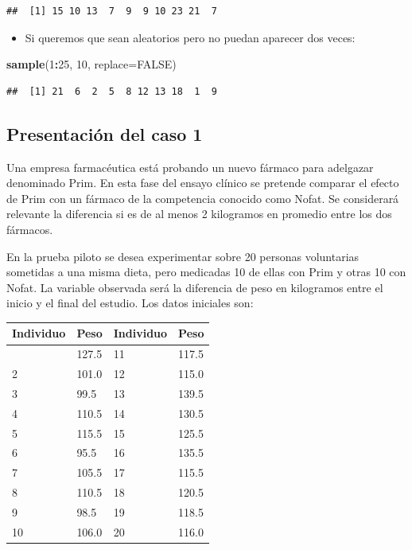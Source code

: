 \documentclass[
]{article}
\newenvironment{Shaded}{\begin{snugshade}}{\end{snugshade}}
\newcommand{\AttributeTok}[1]{\textcolor[rgb]{0.13,0.29,0.53}{#1}}
\newcommand{\ConstantTok}[1]{\textcolor[rgb]{0.56,0.35,0.01}{#1}}
\newcommand{\DecValTok}[1]{\textcolor[rgb]{0.00,0.00,0.81}{#1}}
\newcommand{\FunctionTok}[1]{\textcolor[rgb]{0.13,0.29,0.53}{\textbf{#1}}}
\newcommand{\NormalTok}[1]{#1}
\newcommand{\SpecialCharTok}[1]{\textcolor[rgb]{0.81,0.36,0.00}{\textbf{#1}}}
\providecommand{\tightlist}{%
  \setlength{\itemsep}{0pt}\setlength{\parskip}{0pt}}
\begin{document}
\begin{verbatim}
##  [1] 15 10 13  7  9  9 10 23 21  7
\end{verbatim}

\begin{itemize}
\tightlist
\item
  Si queremos que sean aleatorios pero no puedan aparecer dos veces:
\end{itemize}

\begin{Shaded}
\begin{Highlighting}[]
\FunctionTok{sample}\NormalTok{(}\DecValTok{1}\SpecialCharTok{:}\DecValTok{25}\NormalTok{, }\DecValTok{10}\NormalTok{, }\AttributeTok{replace=}\ConstantTok{FALSE}\NormalTok{)}
\end{Highlighting}
\end{Shaded}

\begin{verbatim}
##  [1] 21  6  2  5  8 12 13 18  1  9
\end{verbatim}

\subsection{Presentación del caso 1}\label{presentaciuxf3n-del-caso-1}

Una empresa farmacéutica está probando un nuevo fármaco para adelgazar denominado Prim. En esta fase del ensayo clínico se pretende comparar el efecto de Prim con un fármaco de la competencia conocido como Nofat. Se considerará relevante la diferencia si es de al menos 2 kilogramos en promedio entre los dos fármacos.

En la prueba piloto se desea experimentar sobre 20 personas voluntarias sometidas a una misma dieta, pero medicadas 10 de ellas con Prim y otras 10 con Nofat. La variable observada será la diferencia de peso en kilogramos entre el inicio y el final del estudio. Los datos iniciales son:

\begin{longtable}[]{@{}llll@{}}
\toprule\noalign{}
Individuo & Peso & Individuo & Peso \\
\midrule\noalign{}
\endhead
\bottomrule\noalign{}
\endlastfoot
1 & 127.5 & 11 & 117.5 \\
2 & 101.0 & 12 & 115.0 \\
3 & 99.5 & 13 & 139.5 \\
4 & 110.5 & 14 & 130.5 \\
5 & 115.5 & 15 & 125.5 \\
6 & 95.5 & 16 & 135.5 \\
7 & 105.5 & 17 & 115.5 \\
8 & 110.5 & 18 & 120.5 \\
9 & 98.5 & 19 & 118.5 \\
10 & 106.0 & 20 & 116.0 \\
\end{longtable}
\end{document}
